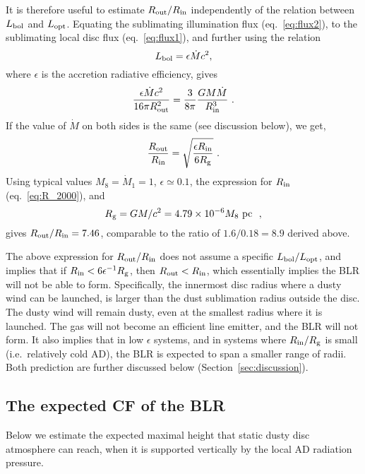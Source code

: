 \documentclass[a4paper,fleqn,usenatbib]{mnras}
\newcommand{\mdot}{\dot{M}}
\begin{document}
It is therefore useful to estimate  
$R_{\rm out}/R_{\rm in}$ independently of the relation between $L_{\rm bol}$ and $L_{\rm opt}$. 
Equating the sublimating illumination flux (eq.~\ref{eq:flux2}), to the sublimating local disc
flux (eq.~\ref{eq:flux1}), and further using the relation 
\begin{equation}
L_{\rm bol}=\epsilon \mdot c^2 ,
\end{equation}
where $\epsilon$ is the accretion radiative efficiency, gives
\begin{equation}
\frac{\epsilon \mdot c^2}{16\pi R_{\rm out}^2}  =\frac{3}{8\pi}\frac{GM\mdot}{R_{\rm in}^3}\ .
\end{equation}
If the value of $\mdot$ on both sides is the same (see discussion below), we get, 
\begin{equation}
\frac{R_{\rm out}}{R_{\rm in}}=\sqrt{\frac{\epsilon R_{\rm in}}{6R_{\rm g}}}\ .
\end{equation}
Using typical values $M_8=\mdot_1=1$, $\epsilon\simeq 0.1$, the expression for $R_{\rm in}$ (eq.~\ref{eq:R_2000}), 
and 
\begin{equation}
R_{\rm g}=GM/c^2=4.79\times 10^{-6}M_8~{\rm pc}~\ ,
\end{equation}
gives $R_{\rm out}/R_{\rm in}=7.46$, comparable to the ratio of $1.6/0.18=8.9$ derived above. 

The above expression for $R_{\rm out}/R_{\rm in}$ does not assume 
a specific $L_{\rm bol}/L_{\rm opt}$, and
implies that if $R_{\rm in}<6\epsilon^{-1} R_{\rm g}$, then $R_{\rm out}<R_{\rm in}$, which essentially
implies the BLR will not be able to form. 
Specifically, the innermost disc radius where a dusty wind can be 
launched, is larger than the dust sublimation radius outside the disc. The dusty wind will remain dusty,
even at the smallest radius where it is launched. The gas will not become an efficient line emitter, and the 
BLR will not form. 
It also implies that in
low $\epsilon$ systems, and in systems where $R_{\rm in}/R_{\rm g}$ is small (i.e.\ relatively
cold AD), the BLR is expected
to span a smaller range of radii. Both prediction are further discussed below (Section~\ref{sec:discussion}).



\subsection{The expected CF of the BLR} \label{sec:sub:expected_CF}

Below we estimate the expected maximal height that static dusty disc atmosphere can reach, 
when it is supported vertically by the local AD radiation pressure. 
\end{document}
